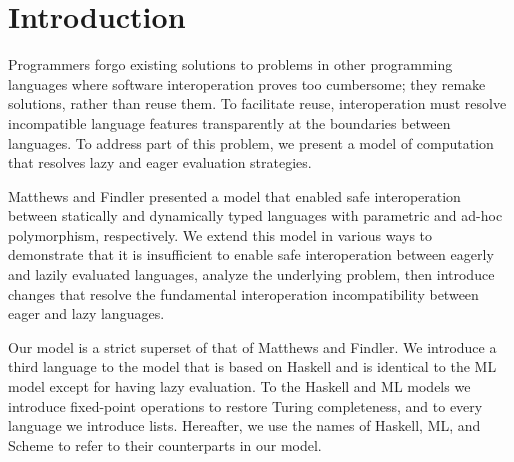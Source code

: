 \section{Introduction}

Programmers forgo existing solutions to problems in other programming languages where software interoperation proves too cumbersome; they remake solutions, rather than reuse them. To facilitate reuse, interoperation must resolve incompatible language features transparently at the boundaries between languages. To address part of this problem, we present a model of computation that resolves lazy and eager evaluation strategies.

Matthews and Findler presented \cite{matthews07} a model that enabled safe interoperation between statically and dynamically typed languages with parametric and ad-hoc polymorphism, respectively. We extend this model in various ways to demonstrate that it is insufficient to enable safe interoperation between eagerly and lazily evaluated languages, analyze the underlying problem, then introduce changes that resolve the fundamental interoperation incompatibility between eager and lazy languages.

Our model is a strict superset of that of Matthews and Findler. We introduce a third language to the model that is based on Haskell and is identical to the ML model except for having lazy evaluation. To the Haskell and ML models we introduce fixed-point operations to restore Turing completeness, and to every language we introduce lists. Hereafter, we use the names of Haskell, ML, and Scheme to refer to their counterparts in our model.